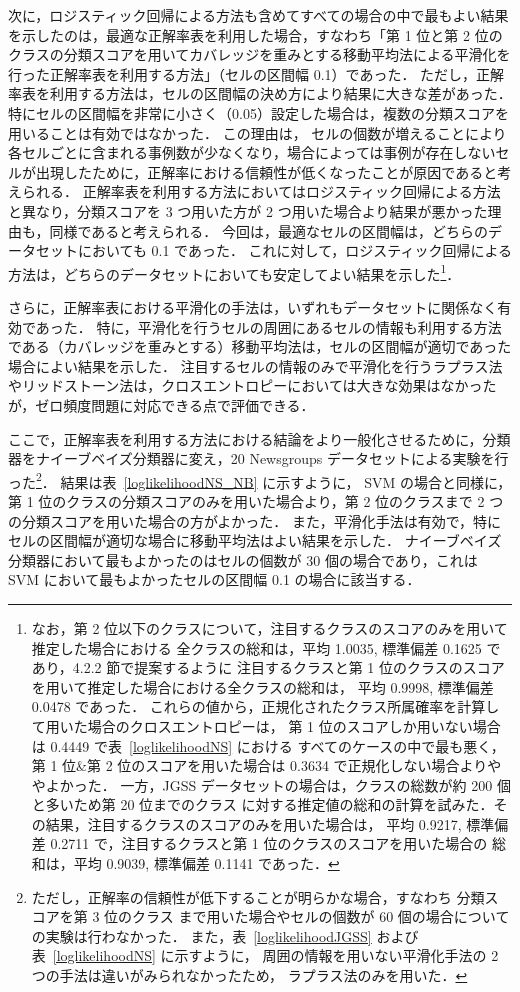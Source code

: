 \documentclass[japanese]{jnlp_1.4}
\begin{document}
次に，ロジスティック回帰による方法も含めてすべての場合の中で最もよい結果を示したのは，最適な正解率表を利用した場合，すなわち「第 1 位と第 2 位のクラスの分類スコアを用いてカバレッジを重みとする移動平均法による平滑化を行った正解率表を利用する方法」（セルの区間幅 0.1）であった．
ただし，正解率表を利用する方法は，セルの区間幅の決め方により結果に大きな差があった．
特にセルの区間幅を非常に小さく（0.05）設定した場合は，複数の分類スコアを用いることは有効ではなかった．
この理由は，
セルの個数が増えることにより各セルごとに含まれる事例数が少なくなり，場合によっては事例が存在しないセルが出現したために，正解率における信頼性が低くなったことが原因であると考えられる．
正解率表を利用する方法においてはロジスティック回帰による方法と異なり，分類スコアを 3 つ用いた方が 2 つ用いた場合より結果が悪かった理由も，同様であると考えられる．
今回は，最適なセルの区間幅は，どちらのデータセットにおいても 0.1 であった．
これに対して，ロジスティック回帰による方法は，どちらのデータセットにおいても安定してよい結果を示した\footnote{
	なお，第 2 位以下のクラスについて，注目するクラスのスコアのみを用いて推定した場合における
	全クラスの総和は，平均 1.0035, 標準偏差 0.1625 であり，4.2.2 節で提案するように
	注目するクラスと第 1 位のクラスのスコアを用いて推定した場合における全クラスの総和は，
	平均 0.9998, 標準偏差 0.0478 であった．
	これらの値から，正規化されたクラス所属確率を計算して用いた場合のクロスエントロピーは，
	第 1 位のスコアしか用いない場合は 0.4449 で表~\ref{loglikelihoodNS} における
	すべてのケースの中で最も悪く，
	第 1 位\&第 2 位のスコアを用いた場合は 0.3634 で正規化しない場合よりややよかった．
	一方，JGSS データセットの場合は，クラスの総数が約 200 個と多いため第 20 位までのクラス
	に対する推定値の総和の計算を試みた．その結果，注目するクラスのスコアのみを用いた場合は，
	平均 0.9217, 標準偏差 0.2711 で，注目するクラスと第 1 位のクラスのスコアを用いた場合の
	総和は，平均 0.9039, 標準偏差 0.1141 であった．
}．

さらに，正解率表における平滑化の手法は，いずれもデータセットに関係なく有効であった．
特に，平滑化を行うセルの周囲にあるセルの情報も利用する方法である（カバレッジを重みとする）移動平均法は，セルの区間幅が適切であった場合によい結果を示した．
注目するセルの情報のみで平滑化を行うラプラス法やリッドストーン法は，クロスエントロピーにおいては大きな効果はなかったが，ゼロ頻度問題に対応できる点で評価できる．

ここで，正解率表を利用する方法における結論をより一般化させるために，分類器をナイーブベイズ分類器に変え，20 Newsgroups データセットによる実験を行った\footnote{
	ただし，正解率の信頼性が低下することが明らかな場合，すなわち 分類スコアを第 3 位のクラス
	まで用いた場合やセルの個数が 60 個の場合についての実験は行わなかった．
	また，表~\ref{loglikelihoodJGSS} および表~\ref{loglikelihoodNS} に示すように，
	周囲の情報を用いない平滑化手法の 2 つの手法は違いがみられなかったため，
	ラプラス法のみを用いた．
}．
結果は表~\ref{loglikelihoodNS_NB} に示すように，
SVM の場合と同様に，
第 1 位のクラスの分類スコアのみを用いた場合より，第 2 位のクラスまで 2 つの分類スコアを用いた場合の方がよかった．
また，平滑化手法は有効で，特にセルの区間幅が適切な場合に移動平均法はよい結果を示した．
ナイーブベイズ分類器において最もよかったのはセルの個数が 30 個の場合であり，これは SVM において最もよかったセルの区間幅 0.1 の場合に該当する．
\end{document}
